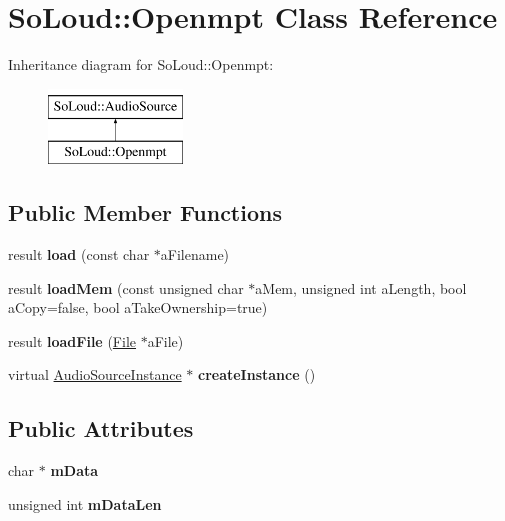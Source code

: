 \hypertarget{class_so_loud_1_1_openmpt}{}\section{So\+Loud\+::Openmpt Class Reference}
\label{class_so_loud_1_1_openmpt}
Inheritance diagram for So\+Loud\+::Openmpt\+:\begin{figure}[H]
\begin{center}
\leavevmode
\includegraphics[height=2.000000cm]{class_so_loud_1_1_openmpt}
\end{center}
\end{figure}
\subsection*{Public Member Functions}
\begin{DoxyCompactItemize}
\item 
\mbox{\label{class_so_loud_1_1_openmpt_a35783563cef53b84632be55fb2d88175}} 
result {\bfseries load} (const char $\ast$a\+Filename)
\item 
\mbox{\label{class_so_loud_1_1_openmpt_a010076ad5ba45fe03ca62c905b76a785}} 
result {\bfseries load\+Mem} (const unsigned char $\ast$a\+Mem, unsigned int a\+Length, bool a\+Copy=false, bool a\+Take\+Ownership=true)
\item 
\mbox{\label{class_so_loud_1_1_openmpt_a54d2894caf077b71ae93086720d7967b}} 
result {\bfseries load\+File} (\mbox{\hyperlink{class_so_loud_1_1_file}{File}} $\ast$a\+File)
\item 
\mbox{\label{class_so_loud_1_1_openmpt_a32bea18b507db6bb5a4b613065f78515}} 
virtual \mbox{\hyperlink{class_so_loud_1_1_audio_source_instance}{Audio\+Source\+Instance}} $\ast$ {\bfseries create\+Instance} ()
\end{DoxyCompactItemize}
\subsection*{Public Attributes}
\begin{DoxyCompactItemize}
\item 
\mbox{\label{class_so_loud_1_1_openmpt_a2829642efe9bf6cd93082bf8390c7140}} 
char $\ast$ {\bfseries m\+Data}
\item 
\mbox{\label{class_so_loud_1_1_openmpt_a8b30c5a8ef807295e9052f304031744c}} 
unsigned int {\bfseries m\+Data\+Len}
\end{DoxyCompactItemize}
